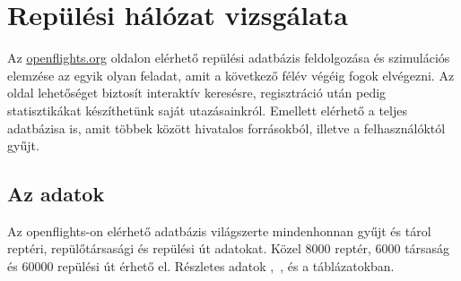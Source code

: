 \chapter{Repülési hálózat vizsgálata}\label{test}

Az \href{http://openflights.org/}{openflights.org} oldalon elérhető repülési adatbázis feldolgozása és szimulációs elemzése az egyik olyan feladat, amit a következő félév végéig fogok elvégezni. Az oldal lehetőséget biztosít interaktív keresésre, regisztráció után pedig statisztikákat készíthetünk saját utazásainkról. Emellett elérhető a teljes adatbázisa is, amit többek között hivatalos forrásokból, illetve a felhasználóktól gyűjt.

  \section{Az adatok}
  Az openflights-on elérhető adatbázis világszerte mindenhonnan gyűjt és tárol reptéri, repülőtársasági és repülési út adatokat. Közel 8000 reptér, 6000 társaság és 60000 repülési út érhető el. Részletes adatok ,~, és a  táblázatokban.

